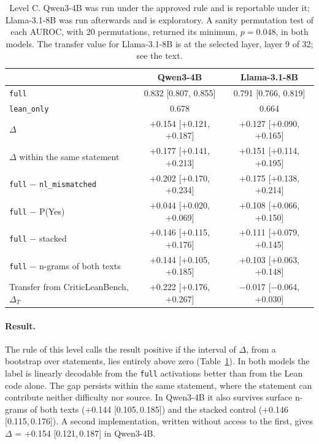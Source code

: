 \documentclass[10pt]{article}
\newcommand{\vr}[1]{\texttt{#1}}
\newcommand{\D}{\Delta}
\newcommand{\ic}[2]{[#1,\,#2]}
\begin{document}
\begin{table}[h]
\centering
\caption{Level C. Qwen3-4B was run under the approved rule and is reportable under it; Llama-3.1-8B was run
afterwards and is exploratory. A sanity permutation test of each AUROC, with 20 permutations, returned its minimum, $p = 0.048$, in
both models. The transfer value for Llama-3.1-8B is at the selected layer, layer 9 of 32; see the text.}
\label{tab:c}
\vspace{2pt}
\begin{tabular}{@{}lcc@{}}
\toprule
 & Qwen3-4B & Llama-3.1-8B\\
\midrule
\vr{full}                               & 0.832 [0.807, 0.855] & 0.791 [0.766, 0.819]\\
\vr{lean\_only}                         & 0.678 & 0.664\\
$\D$                                    & +0.154 [+0.121, +0.187] & +0.127 [+0.090, +0.165]\\
$\D$ within the same statement          & +0.177 [+0.141, +0.213] & +0.151 [+0.114, +0.195]\\
\vr{full} $-$ \vr{nl\_mismatched}       & +0.202 [+0.170, +0.234] & +0.175 [+0.138, +0.214]\\
\vr{full} $-$ P(Yes)                    & +0.044 [+0.020, +0.069] & +0.108 [+0.066, +0.150]\\
\vr{full} $-$ stacked                 & +0.146 [+0.115, +0.176] & +0.111 [+0.079, +0.145]\\
\vr{full} $-$ n-grams of both texts       & +0.144 [+0.105, +0.185] & +0.103 [+0.063, +0.148]\\
\midrule
Transfer from CriticLeanBench, $\D_T$   & +0.222 [+0.176, +0.267] & −0.017 [−0.064, +0.030]\\
\bottomrule
\end{tabular}
\end{table}

\paragraph{Result.}
The rule of this level calls the result positive if the interval of $\D$, from a bootstrap over statements, lies entirely above zero (Table~\ref{tab:c}). In both models the label is linearly decodable from the \vr{full} activations better than from the Lean code alone. The
gap persists within the same statement, where the statement can contribute neither difficulty nor source. In
Qwen3-4B it also survives surface n-grams of both texts (+0.144 \ic{0.105}{0.185}) and the stacked control
(+0.146 \ic{0.115}{0.176}). A second implementation, written without access to the first, gives $\D$ = +0.154 \ic{0.121}{0.187} in Qwen3-4B.
\end{document}
